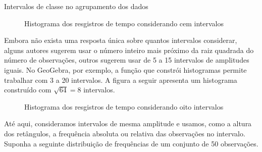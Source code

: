 \begin{example}{Intervalos de classe no agrupamento dos dados}
\begin{figure}[H]
\caption{Histograma dos resgistros de tempo considerando cem intervalos}
\label{est1-fig-15}
\end{figure}

Embora não exista uma resposta única sobre quantos intervalos considerar, alguns autores sugerem usar o número inteiro mais próximo da raiz quadrada do número de observações, outros sugerem usar de 5 a 15 intervalos de amplitudes iguais. No GeoGebra, por exemplo, a função que constrói histogramas permite trabalhar com 3 a 20 intervalos. A figura a seguir apresenta um histograma construído com \(\sqrt{64}=8\) intervalos.

\begin{figure}[H]
\centering
\capstart


\caption{Histograma dos resgistros de tempo considerando oito intervalos}
\label{est1-fig-16}
\end{figure}
\end{example}

Até aqui, consideramos intervalos de mesma amplitude e usamos, como a altura dos retângulos, a frequência absoluta ou relativa das observações no intervalo. Suponha a seguinte distribuição de frequências de um conjunto de 50 observações.

